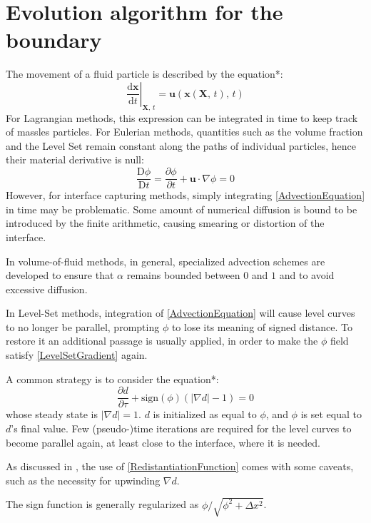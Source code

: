 \documentclass[11pt, a4paper, oneside, openany]{book}
\begin{document}
\section{Evolution algorithm for the boundary}
The movement of a fluid particle is described by the equation*:
\begin{equation*}
\left.\dfrac{\mathrm{d}\boldsymbol{x}}{\mathrm{d}t}\right|_{\boldsymbol{X},\,t}=\boldsymbol{u}\left(\boldsymbol{x}\left(\boldsymbol{X},\,t\right),\,t\right)\label{AdvectionParticle}
\end{equation*}
For Lagrangian methods, this expression can be integrated in time to keep track of massles particles. For Eulerian methods, quantities such as the volume fraction and the Level Set remain constant along the paths of individual particles, hence their material derivative is null:
\begin{equation*}
\dfrac{\mathrm{D}\phi}{\mathrm{D}t}=\dfrac{\partial\phi}{\partial t}+\boldsymbol{u}\cdot\nabla\phi=0\label{AdvectionEquation}
\end{equation*}
However, for interface capturing methods, simply integrating \eqref{AdvectionEquation} in time may be problematic. Some amount of numerical diffusion is bound to be introduced by the finite arithmetic, causing smearing or distortion of the interface.\par
In volume-of-fluid methods, in general, specialized advection schemes are developed to ensure that $\alpha$ remains bounded between $0$ and $1$ and to avoid excessive diffusion.\par
In Level-Set methods, integration of \eqref{AdvectionEquation} will cause level curves to no longer be parallel, prompting $\phi$ to lose its meaning of signed distance. To restore it an additional passage is usually applied, in order to make the $\phi$ field satisfy \eqref{LevelSetGradient} again.\par
A common strategy is to consider the equation*:
\begin{equation*}
	\dfrac{\partial d}{\partial\tau}+\mathrm{sign}\left(\phi\right)\left(\left|\nabla d\right|-1\right)=0\label{RedistantiationFunction}
\end{equation*}
whose steady state is $\left|\nabla d\right|=1$. $d$ is initialized as equal to $\phi$, and $\phi$ is set equal to $d$'s final value. Few (pseudo-)time iterations are required for the level curves to become parallel again, at least close to the interface, where it is needed.\par
As discussed in \cite{hartmann2008differential}, the use of \eqref{RedistantiationFunction} comes with some caveats, such as the necessity for upwinding $\nabla d$.\par
The sign function is generally regularized as $\phi / \sqrt{\phi^{2}+\Delta x^{2}}$.
\end{document}
